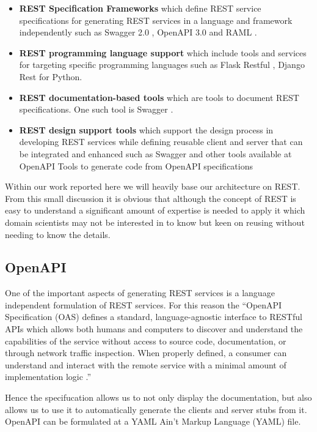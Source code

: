 \begin{itemize}
\tightlist
\item \textbf{REST Specification Frameworks} which  define
  REST service specifications for generating REST services in a
  language and framework independently such as Swagger 2.0
  \cite{openapi-2}, OpenAPI 3.0 \cite{openapi-3} and RAML
  \cite{raml-1}.
\item \textbf{REST programming language support} which include tools and services
  for targeting specific programming languages such as Flask Restful
  \cite{www-flask-restful}, Django Rest \cite{www-django-rest} for Python.
\item \textbf{REST documentation-based tools} which are tools to document
  REST specifications. One such tool is Swagger \cite{www-swagger}.
\item \textbf{REST design support tools} which support the
  design process in developing REST services while defining reusable client and server that can be integrated and enhanced such as Swagger \cite{www-swagger} and other tools
  available at OpenAPI Tools \cite{www-openapi-tools} to generate code
  from OpenAPI specifications \cite{www-swagger-codegen}
\end{itemize}

Within our work reported here we will heavily base our architecture on REST. From this small discussion it is obvious that although the concept of REST is easy to understand a significant amount of expertise is needed to apply it which domain scientists may not be interested in to know but keen on reusing without needing to know the details.

\subsection{OpenAPI}

One of the important aspects of generating REST services is a language independent formulation of REST services. For this reason the ``OpenAPI Specification (OAS) defines a standard, language-agnostic interface to RESTful APIs which allows both humans and computers to discover and understand the capabilities of the service without access to source code, documentation, or through network traffic inspection. When properly defined, a consumer can understand and interact with the remote service with a minimal amount of implementation logic \cite{openapi}.''

Hence the specifucation allows us to not only display the documentation, but also allows us to use it to automatically generate the clients and server stubs from it. OpenAPI can be formulated at a YAML Ain't Markup Language (YAML) \cite{www-yaml} file. 

